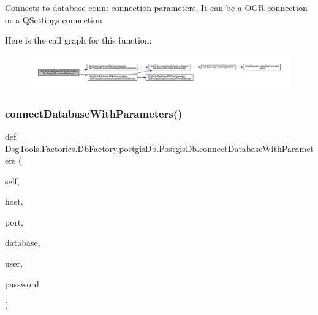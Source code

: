 \begin{DoxyVerb}Connects to database
conn: connection parameters. It can be a OGR connection or a QSettings connection
\end{DoxyVerb}
 Here is the call graph for this function\+:
\nopagebreak
\begin{figure}[H]
\begin{center}
\leavevmode
\includegraphics[width=350pt]{class_dsg_tools_1_1_factories_1_1_db_factory_1_1postgis_db_1_1_postgis_db_aefc6ec43dd4d6e8f63d43e3f36f7cba2_cgraph}
\end{center}
\end{figure}
\mbox{\label{class_dsg_tools_1_1_factories_1_1_db_factory_1_1postgis_db_1_1_postgis_db_a552929486e4a1e3d3fc9b87dffc8e0b9}} 
\subsubsection{\texorpdfstring{connect\+Database\+With\+Parameters()}{connectDatabaseWithParameters()}}
{\footnotesize\ttfamily def Dsg\+Tools.\+Factories.\+Db\+Factory.\+postgis\+Db.\+Postgis\+Db.\+connect\+Database\+With\+Parameters (\begin{DoxyParamCaption}\item[{}]{self,  }\item[{}]{host,  }\item[{}]{port,  }\item[{}]{database,  }\item[{}]{user,  }\item[{}]{password }\end{DoxyParamCaption})}

